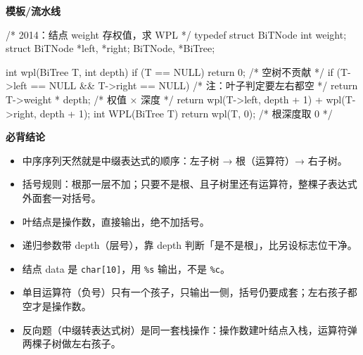 \documentclass[10pt,a4paper]{ctexart}
\begin{document}
\textbf{模板/流水线}

\begin{codebox}
/* 2014：结点 weight 存权值，求 WPL */
typedef struct BiTNode {
    int weight;
    struct BiTNode *left, *right;
} BiTNode, *BiTree;

int wpl(BiTree T, int depth) {
    if (T == NULL) return 0;                            /* 空树不贡献 */
    if (T->left == NULL && T->right == NULL)            /* 注：叶子判定要左右都空 */
        return T->weight * depth;                       /* 权值 × 深度 */
    return wpl(T->left, depth + 1) + wpl(T->right, depth + 1);
}
int WPL(BiTree T) { return wpl(T, 0); }                 /* 根深度取 0 */
\end{codebox}





\textbf{必背结论}

\begin{itemize}

\item 中序序列天然就是中缀表达式的顺序：左子树 → 根（运算符）→ 右子树。

\item 括号规则：根那一层不加；只要不是根、且子树里还有运算符，整棵子表达式外面套一对括号。

\item 叶结点是操作数，直接输出，绝不加括号。

\item 递归参数带 depth（层号），靠 depth 判断「是不是根」，比另设标志位干净。

\item 结点 data 是 \texttt{char[10]}，用 \texttt{\%s} 输出，不是 \texttt{\%c}。

\item 单目运算符（负号）只有一个孩子，只输出一侧，括号仍要成套；左右孩子都空才是操作数。

\item 反向题（中缀转表达式树）是同一套栈操作：操作数建叶结点入栈，运算符弹两棵子树做左右孩子。

\end{itemize}
\end{document}
